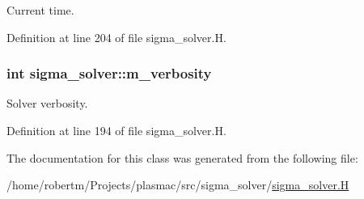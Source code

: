 Current time. 



Definition at line 204 of file sigma\+\_\+solver.\+H.

\subsubsection[{\texorpdfstring{m\+\_\+verbosity}{m_verbosity}}]{\setlength{\rightskip}{0pt plus 5cm}int sigma\+\_\+solver\+::m\+\_\+verbosity\hspace{0.3cm}{\ttfamily [protected]}}\hypertarget{classsigma__solver_a74df5cbca9b971faac0750553c0f669f}{}\label{classsigma__solver_a74df5cbca9b971faac0750553c0f669f}


Solver verbosity. 



Definition at line 194 of file sigma\+\_\+solver.\+H.



The documentation for this class was generated from the following file\+:\begin{DoxyCompactItemize}
\item 
/home/robertm/\+Projects/plasmac/src/sigma\+\_\+solver/\hyperlink{sigma__solver_8H}{sigma\+\_\+solver.\+H}\end{DoxyCompactItemize}
